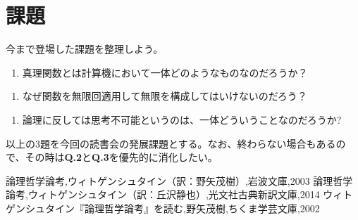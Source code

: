 \documentclass[11pt,a4paper,onecolumn,article]{jarticle}
\newcounter{ct}               %
\begin{document}
\section{課題}

今まで登場した課題を整理しよう。

\setcounter{ct}{1}
\begin{enumerate}
  \item 真理関数とは計算機において一体どのようなものなのだろうか？
\end{enumerate}

\begin{enumerate}
  \item なぜ関数を無限回適用して無限を構成してはいけないのだろう？
\end{enumerate}

\begin{enumerate}
  \item 論理に反しては思考不可能というのは、一体どういうことなのだろうか?
\end{enumerate}

以上の3題を今回の読書会の発展課題とする。なお、終わらない場合もあるので、その時は{\bf{Q.2}}と{\bf{Q.3}}を優先的に消化したい。


\begin{thebibliography}{9}
   論理哲学論考,ウィトゲンシュタイン（訳：野矢茂樹）,岩波文庫,2003
   論理哲学論考,ウィトゲンシュタイン（訳：丘沢静也）,光文社古典新訳文庫,2014
   ウィトゲンシュタイン『論理哲学論考』を読む,野矢茂樹,ちくま学芸文庫,2002
\end{thebibliography}
\end{document}

